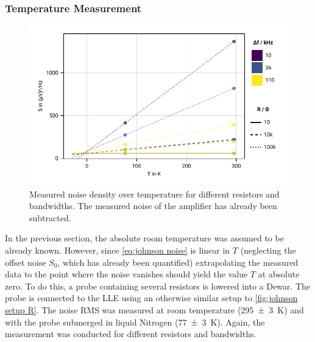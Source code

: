 \documentclass[
    parskip=half, 
    twoside=false,
    twocolumn=true,
    fontsize=11pt,
]{scrarticle}
\begin{document}
\subsubsection*{Temperature Measurement}
\begin{figure}[h!]
    \centering
    \includegraphics{figures/02 temperature.pdf}
    \caption{
        Measured noise density over temperature for different resistors and bandwidths.
        The measured noise of the amplifier has already been subtracted.
    }
    \label{fig:johnson noise temperature}
\end{figure}
In the previous section, the absolute room temperature was assumed to be already known. 
However, since \autoref{eq:johnson noise} is linear in $T$ (neglecting the offset noise $S_0$, which has already been quantified) extrapolating the measured data to the point where the noise vanishes should yield the value $T$ at absolute zero. 
To do this, a probe containing several resistors is lowered into a Dewar. 
The probe is connected to the LLE using an otherwise similar setup to \autoref{fig:johnson setup R}. The noise RMS was measured at room temperature (\SI{295(3)}{K}) and with the probe submerged in liquid Nitrogen (\SI{77(3)}{K}). Again, the measurement was conducted for different resistors and bandwidths.

\end{document}
